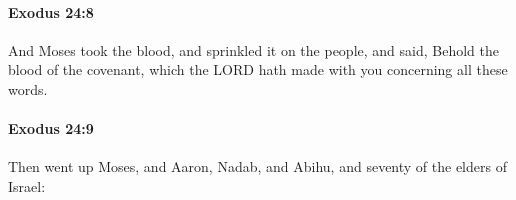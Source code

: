 		\paragraph{Exodus 24:8} %
			\label{EXODUS-24-8}

			And Moses took the blood, and sprinkled it on the people, and said, Behold the blood of the covenant, which the LORD hath made with you concerning all these words.


		\paragraph{Exodus 24:9} %
			\label{EXODUS-24-9}

			Then went up Moses, and Aaron, Nadab, and Abihu, and seventy of the elders of Israel:


